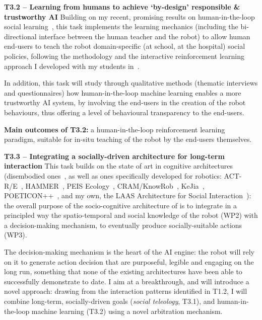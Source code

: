 \textbf{T3.2 -- Learning from humans to achieve `by-design' responsible \&
trustworthy AI}
Building on my recent, promising results on human-in-the-loop
social learning~\cite{senft2019teaching,winkle2020couch}, this task
implements the learning mechanics (including the bi-directional interface
between the human teacher and the robot) to allow human end-users to
teach the robot domain-specific (at school, at the hospital) social policies,
following the methodology and the interactive reinforcement learning approach I
developed with my students in~\cite{senft2017supervised}.

In addition, this task will study through qualitative methods (thematic
interviews and questionnaires) how human-in-the-loop machine learning enables a more
trustworthy AI system, by involving the end-users in the creation of the robot
behaviours, thus offering a level of behavioural transparency to the end-users.

\begin{framed}
    {\noindent\bf Main outcomes of T3.2:} a human-in-the-loop reinforcement
    learning paradigm, suitable for in-situ teaching of the robot by the
    end-users themselves.
\end{framed}

\textbf{T3.3 -- Integrating a socially-driven architecture for long-term interaction}
This task builds on the state of art in cognitive architectures (disembodied
ones~\cite{chong2007integrated,vernon2007survey,kingdon2008review,duch2008cognitive,langley2009cognitive,taatgen2010past,thorisson2012cognitive},
as well as ones specifically developed for robotics:
ACT-R/E~\cite{trafton2013act}, HAMMER~\cite{demiris2006hierarchical}, PEIS
Ecology~\cite{saffiotti2005peis,daoutis2012cooperative},
CRAM/KnowRob~\cite{beetz2010cram, tenorth2009knowrob},
KeJia~\cite{chen2010developing}, POETICON++~\cite{antunes2016human}, and my own,
the LAAS Architecture for Social Interaction~\cite{lemaignan2017artificial}):
the overall purpose of the socio-cognitive architecture of \project is to
integrate in a principled way the spatio-temporal and social knowledge of the
robot (WP2) with a decision-making mechanism, to eventually produce
socially-suitable actions (WP3). 

The decision-making mechanism is the heart of the \project AI engine: the robot
will rely on it to generate action decision that are purposeful, legible and engaging on the
long run, something that none of the existing architectures have been able to
successfully demonstrate to date. I aim at a breakthrough, and will
introduce a novel approach: drawing from the interaction patterns identified
in T1.2, I will combine long-term, socially-driven goals (\emph{social teleology}, T3.1), and
human-in-the-loop machine learning (T3.2) using a novel arbitration mechanism.

